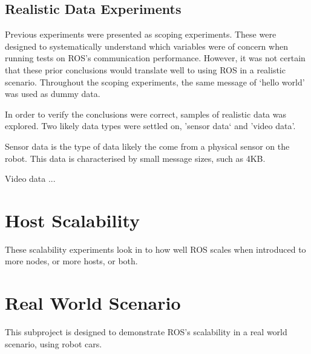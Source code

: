 \documentclass{l4proj}
\begin{document}








\section{Realistic Data Experiments}

Previous experiments were presented as scoping experiments. These were designed to systematically understand which variables were of concern when running tests on ROS's communication performance. However, it was not certain that these prior conclusions would translate well to using ROS in a realistic scenario. Throughout the scoping experiments, the same message of `hello world' was used as dummy data.

In order to verify the conclusions were correct, samples of realistic data was explored. Two likely data types were settled on, 'sensor data` and 'video data'.

Sensor data is the type of data likely the come from a physical sensor on the robot. This data is characterised by small message sizes, such as 4KB.

Video data ...





\chapter{Host Scalability}

These scalability experiments look in to how well ROS scales when introduced to more nodes, or more hosts, or both.




\chapter{Real World Scenario}

This subproject is designed to demonstrate ROS's scalability in a real world scenario, using robot cars.
\end{document}
